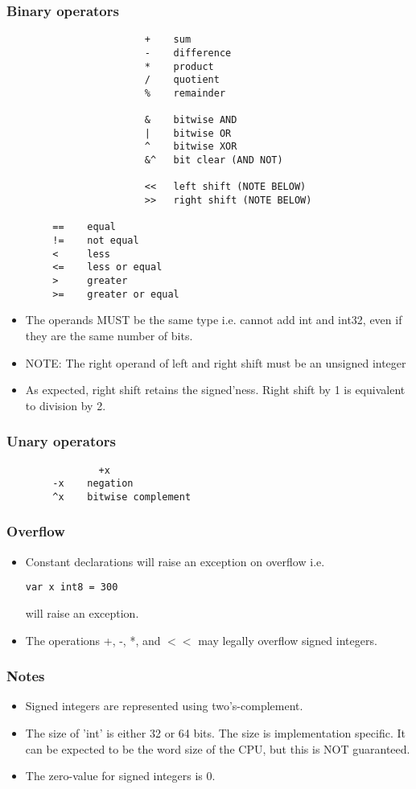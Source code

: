 \documentclass{article}
\begin{document}
			\subsubsection{Binary operators}
				\begin{verbatim}
					    +    sum  
					    -    difference   
					    *    product       
					    /    quotient     
					    %    remainder  

					    &    bitwise AND    
					    |    bitwise OR    
					    ^    bitwise XOR   
					    &^   bit clear (AND NOT) 

					    <<   left shift (NOTE BELOW)
					    >>   right shift (NOTE BELOW)
					    
	    ==    equal
	    !=    not equal
	    <     less
	    <=    less or equal
	    >     greater
	    >=    greater or equal
				\end{verbatim}	
				\begin{itemize}
					\item The operands MUST be the same type i.e. cannot add int and int32, even if they are the same number of bits.  
					\item NOTE: The right operand of left and right shift must be an unsigned integer
					\item As expected, right shift retains the signed'ness. Right shift by 1 is equivalent to division by 2.
				\end{itemize}
			\subsubsection{Unary operators}
				\begin{verbatim}
		   		+x                     
	    -x    negation         
	    ^x    bitwise complement 
				\end{verbatim}
			\subsubsection{Overflow}
				\begin{itemize}
					\item Constant declarations will raise an exception on overflow i.e. \begin{verbatim}var x int8 = 300\end{verbatim} will raise an exception.
					\item The operations +, -, *, and \(<<\) may legally overflow signed integers. 
				\end{itemize}
			\subsubsection{Notes}
				\begin{itemize}
					\item Signed integers are represented using two's-complement. 
					\item The size of 'int' is either 32 or 64 bits. The size is implementation specific. It can be expected to be the word size of the CPU, but this is NOT guaranteed.
					\item The zero-value for signed integers is \colorbox{code}{0}.
				\end{itemize}
				
\end{document}
